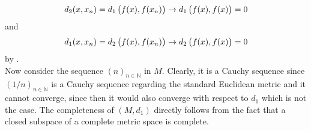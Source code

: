 \begin{enumerate}[label = \textbf{Exercise \arabic*.},wide = 0pt, itemsep=1.5ex]
\begin{enumerate}[label = \alph*),wide = 0pt, itemsep=1.5ex]
		\begin{equation*}
			d_2(x,x_n) = d_1\del[1]{f(x),f(x_n)} \to  d_1\del[1]{f(x),f(x)} = 0
		\end{equation*}
		\noindent and
		\begin{equation*}
			d_1(x,x_n) = d_2\del[1]{f(x),f(x_n)} \to  d_2\del[1]{f(x),f(x)} = 0
		\end{equation*}
		\noindent by \cite[260]{engelking:general_topology:1989}.\\
		Now consider the sequence $(n)_{n \in \mathbb{N}}$ in $M$. Clearly, it is a Cauchy sequence since $(1/n)_{n \in \mathbb{N}}$ is a Cauchy sequence regarding the standard Euclidean metric and it cannot converge, since then it would also converge with respect to $d_1$ which is not the case. The completeness of $(M,d_1)$ directly follows from the fact that a closed subspace of a complete metric space is complete.		 
	\end{enumerate}
\end{enumerate}
\printbibliography

